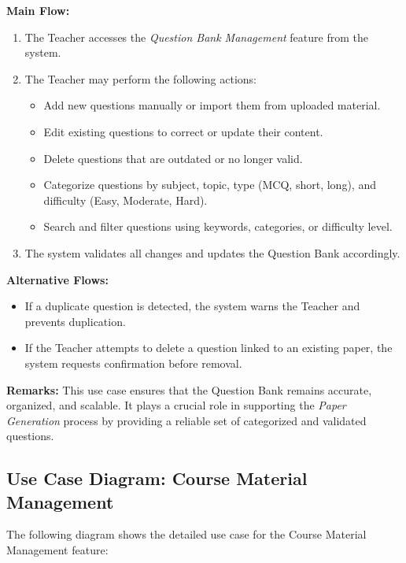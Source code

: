 \documentclass[12pt]{article}
\begin{document}
	\textbf{Main Flow:}
	\begin{enumerate}
		\item The Teacher accesses the \textit{Question Bank Management} feature from the system.
		\item The Teacher may perform the following actions:
		\begin{itemize}
			\item Add new questions manually or import them from uploaded material.
			\item Edit existing questions to correct or update their content.
			\item Delete questions that are outdated or no longer valid.
			\item Categorize questions by subject, topic, type (MCQ, short, long), and difficulty (Easy, Moderate, Hard).
			\item Search and filter questions using keywords, categories, or difficulty level.
		\end{itemize}
		\item The system validates all changes and updates the Question Bank accordingly.
	\end{enumerate}
	
	\textbf{Alternative Flows:}
	\begin{itemize}
		\item If a duplicate question is detected, the system warns the Teacher and prevents duplication.
		\item If the Teacher attempts to delete a question linked to an existing paper, the system requests confirmation before removal.
	\end{itemize}
	
	\textbf{Remarks:}  
	This use case ensures that the Question Bank remains accurate, organized, and scalable. It plays a crucial role in supporting the \textit{Paper Generation} process by providing a reliable set of categorized and validated questions.
	\newpage
	\subsection{Use Case Diagram: Course Material Management}
	
	The following diagram shows the detailed use case for the Course Material Management feature:
	
\end{document}
